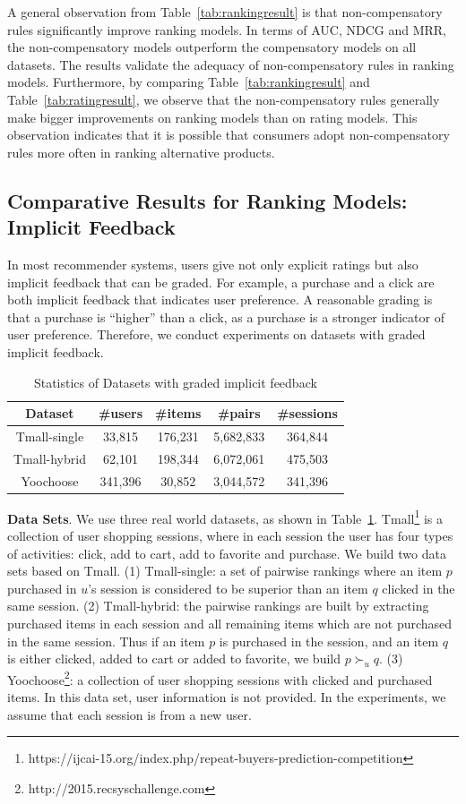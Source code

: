 \documentclass[letterpaper]{article} %
\begin{document}
A general observation from Table~\ref{tab:rankingresult} is that non-compensatory rules significantly improve ranking models. In terms of AUC, NDCG and MRR, the non-compensatory models outperform the compensatory models on all datasets. The results validate the adequacy of non-compensatory rules in ranking  models. Furthermore, by comparing Table~\ref{tab:rankingresult} and Table~\ref{tab:ratingresult}, we observe that the non-compensatory rules generally make bigger improvements on ranking models than on rating models. This observation indicates that it is possible that consumers adopt non-compensatory rules more often in ranking alternative products.
\subsection{Comparative Results for Ranking Models: Implicit Feedback}
In most recommender systems, users give not only explicit ratings but also implicit feedback that can be graded. For example, a purchase and a click are both implicit feedback that indicates user preference. A reasonable grading is that a purchase is ``higher'' than a click, as a purchase is a stronger indicator of user preference. Therefore, we conduct experiments on datasets with graded implicit feedback.  

\begin{table}[htp]
\caption{Statistics of Datasets with graded implicit feedback}
\small
\centering
\begin{tabular}{|c|c|c|c|c|}
\hline
Dataset & \#users & \#items & \#pairs & \#sessions \\\hline
Tmall-single &33,815 &176,231 &5,682,833 &364,844 \\\hline
Tmall-hybrid &62,101 &198,344 &6,072,061 &475,503 \\\hline
Yoochoose &341,396 &30,852 &3,044,572 &341,396 \\\hline
\end{tabular}
\label{tab:idata}
\end{table}%

\textbf{Data Sets}. We use three real world datasets, as shown in Table~\ref{tab:idata}. Tmall\footnote{https://ijcai-15.org/index.php/repeat-buyers-prediction-competition} is a collection of user shopping sessions, where in each session the user has four types of activities: click, add to cart, add to favorite and purchase. We build two data sets based on Tmall. (1) Tmall-single: a set of pairwise rankings where an item $p$ purchased in $u$'s session is considered to be superior than an item $q$ clicked in the same session. (2) Tmall-hybrid: the pairwise rankings are built by extracting purchased items in each session and all remaining items which are not purchased in the same session. Thus if an item $p$ is purchased in the session, and an item $q$ is either clicked, added to cart or added to favorite, we build $p\succ_u q$. (3) Yoochoose\footnote{http://2015.recsyschallenge.com}: a collection of user shopping sessions with clicked and purchased items. In this data set, user information is not provided. In the experiments, we assume that each session is from a new user. 
\end{document}
